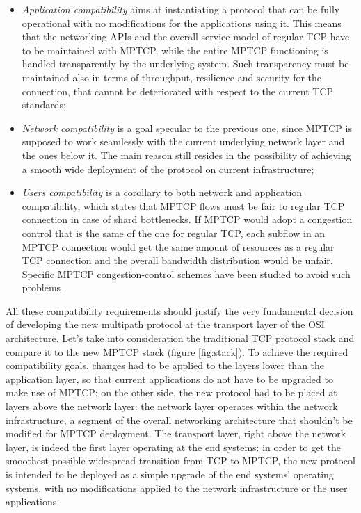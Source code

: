 \begin{itemize}
  \item \textit{Application compatibility} aims at instantiating a protocol that can be fully operational with no modifications for the applications using it. This means that the networking APIs and the overall service model of regular TCP have to be maintained with MPTCP, while the entire MPTCP functioning is handled transparently by the underlying system. Such transparency must be maintained also in terms of throughput, resilience and security for the connection, that cannot be deteriorated with respect to the current TCP standards;
  \item \textit{Network compatibility} is a goal specular to the previous one, since MPTCP is supposed to work seamlessly with the current underlying network layer and the ones below it. The main reason still resides in the possibility of achieving a smooth wide deployment of the protocol on current infrastructure;
  \item \textit{Users compatibility} is a corollary to both network and application compatibility, which states that MPTCP flows must be fair to regular TCP connection in case of shard bottlenecks. If MPTCP would adopt a congestion control that is the same of the one for regular TCP, each subflow in an MPTCP connection would get the same amount of resources as a regular TCP connection and the overall bandwidth distribution would be unfair. Specific MPTCP congestion-control schemes have been studied to avoid such problems \cite{rfc6356}.
\end{itemize}

All these compatibility requirements should justify the very fundamental decision of developing the new multipath protocol at the transport layer of the OSI architecture. Let's take into consideration the traditional TCP protocol stack and compare it to the new MPTCP stack (figure \ref{fig:stack}).
To achieve the required compatibility goals, changes had to be applied to the layers lower than the application layer, so that current applications do not have to be upgraded to make use of MPTCP; on the other side, the new protocol had to be placed at layers above the network layer: the network layer operates within the network infrastructure, a segment of the overall networking architecture that shouldn't be modified for MPTCP deployment. The transport layer, right above the network layer, is indeed the first layer operating at the end systems: in order to get the smoothest possible widespread transition from TCP to MPTCP, the new protocol is intended to be deployed as a simple upgrade of the end systems' operating systems, with no modifications applied to the network infrastructure or the user applications.

